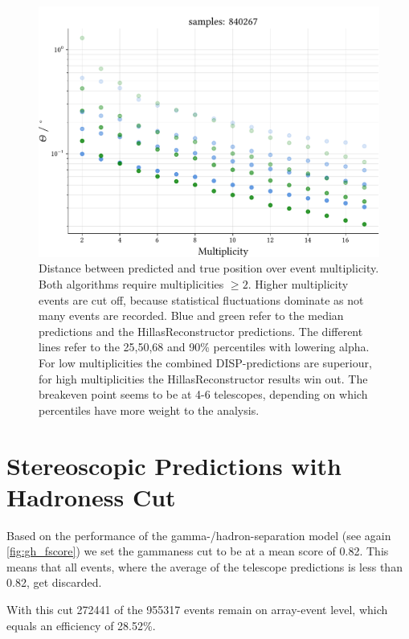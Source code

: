 \begin{figure}
    \centering
    \captionsetup{width=0.9\linewidth}
    \includegraphics[width=0.9\linewidth]{../analysis/plots/gamma/pairwise_median_100_vs_multi_comp.pdf}
    \caption{Distance between predicted and true position over event multiplicity. Both algorithms require
    multiplicities $\geq 2$. Higher multiplicity events are cut off, because 
    statistical fluctuations dominate as not many events are recorded.
    Blue and green refer to the median predictions and the HillasReconstructor predictions.
    The different lines refer to the 25,50,68 and 90\% percentiles with 
    lowering alpha.
    For low multiplicities the combined DISP-predictions are superiour, 
    for high multiplicities the HillasReconstructor results win out.
    The breakeven point seems to be at 4-6 telescopes, depending on 
    which percentiles have more weight to the analysis.}
    \label{fig:stereo_magic_multi}
\end{figure}


\section{Stereoscopic Predictions with Hadroness Cut}

Based on the performance of the gamma-/hadron-separation model 
(see again \ref{fig:gh_fscore})
we set the gammaness cut to be at a mean score of \num{0.82}.
This means that all events, where the average of the telescope predictions
is less than \num{0.82}, get discarded.

With this cut \num{272441} of the \num{955317} events remain on array-event level, 
which equals an efficiency of \num{28.52}\%.

